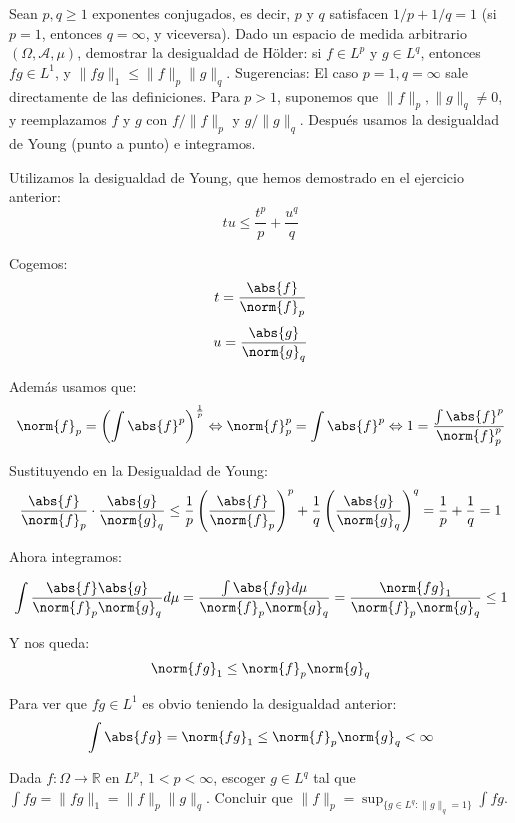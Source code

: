 \begin{problem}[3] Sean $p,q \ge 1$ exponentes conjugados, es decir, $p$ y $q$ satisfacen
$1/p + 1/q =1$ (si $p=1$, entonces $q = \infty$, y viceversa).
Dado un espacio de medida arbitrario $(\Omega, \mathcal{A}, \mu)$, demostrar la desigualdad de
H\"older: si $f\in L^p$ y $g\in L^q$, entonces $fg\in L^1$, y $\|fg\|_1 \le \|f\|_p\|g\|_q$.
Sugerencias: El caso $p=1, q=\infty$ sale directamente de las definiciones.
Para $p >1$, suponemos que  $\|f\|_p, \|g\|_q\ne 0$, y reemplazamos 
$f$ y $g$ con 
 $f/\|f\|_p$ y $g/\|g\|_q$.  Despu\'es usamos la desigualdad de Young (punto a
punto) e integramos.
\solution

\begin{expla}
Utilizamos la desigualdad de Young, que hemos demostrado en el ejercicio anterior:
\[
tu\leq\frac{t^p}{p}+\frac{u^q}{q}
\]

Cogemos:
\[
t=\frac{\abs{f}}{\norm{f}_p}
\]
\[
u=\frac{\abs{g}}{\norm{g}_q}
\]

Además usamos que:
\[
\norm{f}_p=\left( \int \abs{f}^p  \right)^\frac{1}{p}  \Leftrightarrow  \norm{f}_p^p= \int \abs{f}^p \Leftrightarrow 1 = \frac{\int \abs{f}^p}{\norm{f}_p^p}
\]
\end{expla}

Sustituyendo en la Desigualdad de Young:
\[
\frac{\abs{f}}{\norm{f}_p} \cdot \frac{\abs{g}}{\norm{g}_q} \leq \frac{1}{p}\left( \frac{\abs{f}}{\norm{f}_p} \right)^p + \frac{1}{q}\left( \frac{\abs{g}}{\norm{g}_q} \right)^q = \frac{1}{p} +  \frac{1}{q} = 1 
\]

Ahora integramos:

\[
\int \frac{\abs{f}\abs{g}}{{\norm{f}_p}{\norm{g}_q}} d\mu =
\frac{\int \abs{fg}d\mu}{{\norm{f}_p}{\norm{g}_q}} = 
\frac{{\norm{fg}_1}}{{\norm{f}_p}{\norm{g}_q}} \leq 1
\]

Y nos queda:
\[
\norm{fg}_1 \leq \norm{f}_p \norm{g}_q
\]

Para ver que $fg \in L^1$ es obvio teniendo la desigualdad anterior:
\[
\int \abs{fg} = \norm{fg}_1 \leq \norm{f}_p \norm{g}_q < \infty
\]

\end{problem}


\begin{problem}[4] Dada $f:\Omega\to \mathbb{R}$ en $L^p$,  $1 < p <  \infty$, escoger $g\in L^q$ tal que
$\int fg = \|fg\|_1 = \|f\|_p\|g\|_q$. Concluir que 
$\|f\|_p= \operatorname{sup}_{\{g\in L^q: \|g\|_q=1\}} \int fg $.
\solution

\begin{expla}

\end{expla}

\end{problem}

